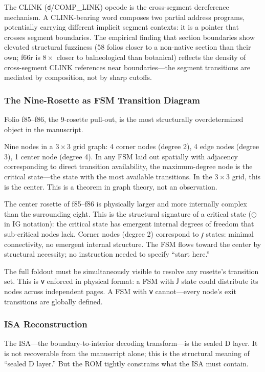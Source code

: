 \documentclass[12pt,a4paper]{article}
\begin{document}
The CLINK (\texttt{d}/COMP\_LINK) opcode is the cross-segment dereference mechanism. A CLINK-bearing word composes two partial address programs, potentially carrying different implicit segment contexts: it is a pointer that crosses segment boundaries. The empirical finding that section boundaries show elevated structural fuzziness (58 folios closer to a non-native section than their own; f66r is $8\times$ closer to balneological than botanical) reflects the density of cross-segment CLINK references near boundaries---the segment transitions are mediated by composition, not by sharp cutoffs.

\subsubsection{The Nine-Rosette as FSM Transition Diagram}

Folio f85--f86, the 9-rosette pull-out, is the most structurally overdetermined object in the manuscript.

Nine nodes in a $3 \times 3$ grid graph: 4 corner nodes (degree 2), 4 edge nodes (degree 3), 1 center node (degree 4). In any FSM laid out spatially with adjacency corresponding to direct transition availability, the maximum-degree node is the critical state---the state with the most available transitions. In the $3 \times 3$ grid, this is the center. This is a theorem in graph theory, not an observation.

The center rosette of f85--f86 is physically larger and more internally complex than the surrounding eight. This is the structural signature of a critical state ($⊙$ in IG notation): the critical state has emergent internal degrees of freedom that sub-critical nodes lack. Corner nodes (degree 2) correspond to $𐑢$ states: minimal connectivity, no emergent internal structure. The FSM flows toward the center by structural necessity; no instruction needed to specify ``start here.''

The full foldout must be simultaneously visible to resolve any rosette's transition set. This is 𐑫 enforced in physical format: a FSM with $𐑓$ state could distribute its nodes across independent pages. A FSM with 𐑫 cannot---every node's exit transitions are globally defined.

\subsubsection{ISA Reconstruction}

The ISA---the boundary-to-interior decoding transform---is the sealed D layer. It is not recoverable from the manuscript alone; this is the structural meaning of ``sealed D layer.'' But the ROM tightly constrains what the ISA must contain.
\end{document}
